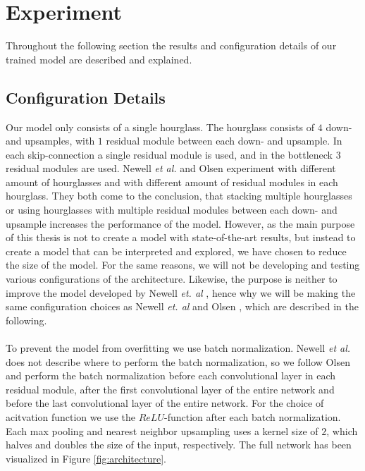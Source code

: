 \documentclass[./main.tex]{subfiles}
\begin{document}
\section{Experiment}\label{experiement}
Throughout the following section the results and configuration details of our trained model are described and explained.

\subsection{Configuration Details}\label{subsec:conf_details}
Our model only consists of a single hourglass. The hourglass consists of $4$ down- and upsamples, with $1$ residual module between each down- and upsample. In each skip-connection a single residual module is used, and in the bottleneck $3$ residual modules are used. Newell \textit{et al.} \cite{Newell} and Olsen \cite{Camilla} experiment with different amount of hourglasses and with different amount of residual modules in each hourglass. They both come to the conclusion, that stacking multiple hourglasses or using hourglasses with multiple residual modules between each down- and upsample increases the performance of the model. However, as the main purpose of this thesis is not to create a model with state-of-the-art results, but instead to create a model that can be interpreted and explored, we have chosen to reduce the size of the model. For the same reasons, we will not be developing and testing various configurations of the architecture. Likewise, the purpose is neither to improve the model developed by Newell \textit{et. al} \cite{Newell}, hence why we will be making the same configuration choices as Newell \textit{et. al} \cite{Newell} and Olsen \cite{Camilla}, which are described in the following.
\\
\\
To prevent the model from overfitting we use batch normalization. Newell \textit{et al.} does not describe where to perform the batch normalization, so we follow Olsen \cite{Camilla} and perform the batch normalization before each convolutional layer in each residual module, after the first convolutional layer of the entire network and before the last convolutional layer of the entire network. For the choice of acitvation function we use the $ReLU$-function after each batch normalization. Each max pooling and nearest neighbor upsampling uses a kernel size of $2$, which halves and doubles the size of the input, respectively. The full network has been visualized in Figure \ref{fig:architecture}.
\\
\end{document}
